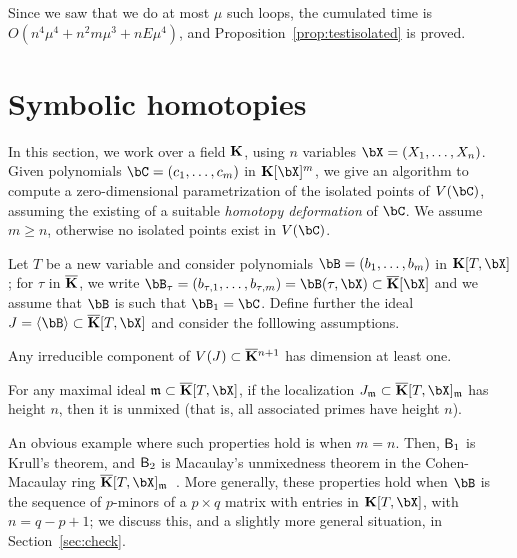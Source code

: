 \documentclass[12pt]{article}
\begin{document}
Since we saw that we do at most $\mu$ such loops, the cumulated time
is $O(n^4 \mu^4 + n^2 m \mu^3 + n E \mu^4)$, and
Proposition~\ref{prop:testisolated} is proved.



\section{Symbolic homotopies}\label{sec:homotopy}

In this section, we work over a field $\mathbf{K}$, using $n$ variables
$\bX=(X_1,\dots,X_n)$. Given polynomials $\bC=(c_1,\dots,c_m)$ in
$\KK[\bX]^m$, we give an algorithm to compute a zero-dimensional
parametrization of the isolated points of $V(\bC)$, assuming the
existing of a suitable {\em homotopy deformation} of $\bC$. We assume
$m\ge n$, otherwise no isolated points exist in $V(\bC)$.

Let $T$ be a new variable and consider polynomials
$\bB=(b_1,\dots,b_m)$ in $\KK[T,\bX]$; for $\tau$ in $\overline{\mathbf{K}}$,
we write $\bB_\tau=(b_{\tau,1},\dots,b_{\tau,m})=\bB(\tau,\bX)\subset
\KKbar[\bX]$ and we assume that $\bB$ is such that $\bB_1=\bC$.
Define further the ideal $J=\langle \bB \rangle \subset \KKbar[T,\bX]$ and
consider the folllowing assumptions.
\begin{description}[leftmargin=*]
\item[$\assA_1.$] Any irreducible component of $V(J) \subset
  \overline{\mathbf{K}}{}^{n+1}$ has dimension at least one.
\item[$\assA_2.$] For any maximal ideal $\m \subset\KKbar[T,\bX]$, if the
  localization $J_\m \subset \KKbar[T,\bX]_\m$ has height $n$, then it is
  unmixed (that is, all associated primes have height $n$).
\end{description}
An obvious example where such properties hold is when $m=n$. Then,
$\mathsf{B}_1$ is Krull's theorem, and $\mathsf{B}_2$ is Macaulay's unmixedness
theorem in the Cohen-Macaulay ring
$\KKbar[T,\bX]_\m$~\cite[Corollary~18.14]{Eisenbud95}. More generally,
these properties hold when $\bB$ is the sequence of $p$-minors of a $p
\times q$ matrix with entries in $\KK[T,\bX]$, with $n=q-p+1$; we
discuss this, and a slightly more general situation, in Section~\ref{sec:check}.  
\end{document}
